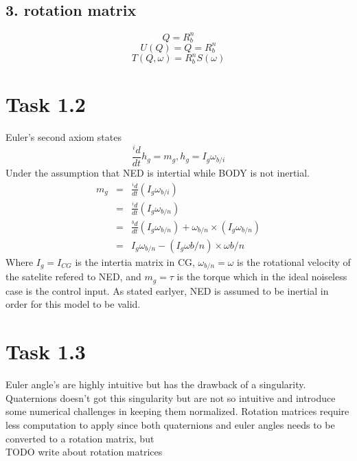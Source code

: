 \documentclass[11pt]{article}
\begin{document}
\subsection*{3. rotation matrix}
\begin{equation}
 Q = R_b^n
\end{equation}
\begin{equation}
 U(Q) = Q = R_b^n
\end{equation}
\begin{equation}
 T(Q,\omega) = R_b^nS(\omega)
\end{equation}

\section*{Task 1.2}
Euler's second axiom states
\[ \frac{^i d}{dt} h_g = m_g, h_g = I_g \omega_{b/i} \]
Under the assumption that NED is intertial while BODY is not inertial.
\begin{eqnarray*}
m_g &=& \frac{^i d}{dt}(I_g \omega_{b/i}) \\
&=& \frac{^i d}{dt}(I_g \omega_{b/n}) \\
&=& \frac{^b d}{dt}(I_g \omega_{b/n}) + \omega_{b/n} \times (I_g \omega_{b/n}) \\
&=& I_g \omega_{b/n} - (I_g \omega{b/n}) \times \omega{b/n}
\end{eqnarray*}
Where $I_g = I_{CG}$ is the intertia matrix in CG, $\omega_{b/n} = \omega$ is the rotational velocity of the satelite refered to NED, and $m_g = \tau$ is the torque which in the ideal noiseless case is the control input. As stated earlyer, NED is assumed to be inertial in order for this model to be valid.

\section{Task 1.3}
Euler angle's are highly intuitive but has the drawback of a singularity. Quaternions doesn't got this singularity but are not so intuitive and introduce some numerical challenges in keeping them normalized. Rotation matrices require less computation to apply since both quaternions and euler angles needs to be converted to a rotation matrix, but 
\\[+1cm] TODO write about rotation matrices
\end{document}
